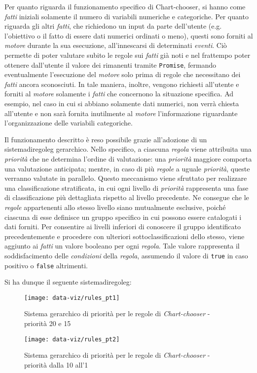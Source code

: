 \bigskip
\noindent Per quanto riguarda il funzionamento specifico di Chart-chooser, si hanno come \emph{fatti} iniziali solamente il numero di variabili numeriche e categoriche. 
Per quanto riguarda gli altri \emph{fatti}, che richiedono un input da parte dell'utente (e.g. l'obiettivo o il fatto di essere dati numerici ordinati o meno), questi sono 
forniti al \emph{motore} durante la sua esecuzione, all'innescarsi di determinati \emph{eventi}. 
Ciò permette di poter valutare subito le regole sui \emph{fatti} già noti e nel frattempo poter ottenere dall'utente il valore dei rimanenti tramite \texttt{Promise}, fermando eventualmente l'esecuzione del \emph{motore} solo
prima di regole che necessitano dei \emph{fatti} ancora sconosciuti.
In tale maniera, inoltre, vengono richiesti all'utente e forniti al \emph{motore} solamente i \emph{fatti} che concernono la situazione specifica. Ad esempio, nel caso in cui si abbiano solamente dati numerici, 
non verrà chiesta all'utente e non sarà fornita inutilmente al \emph{motore} l'informazione riguardante l'organizzazione delle variabili categoriche.

Il funzionamento descritto è reso possibile grazie all'adozione di un \gls{sistemadiregoleg} gerarchico. Nello specifico, a ciascuna \emph{regola} viene attribuita una \emph{priorità} che ne determina l'ordine di valutazione:
una \emph{priorità} maggiore comporta una valutazione anticipata; mentre, in caso di più \emph{regole} a uguale \emph{priorità}, queste verranno valutate in parallelo.
Questo meccanismo viene sfruttato per realizzare una classificazione stratificata, in cui ogni livello di \emph{priorità} rappresenta una fase di classificazione più dettagliata rispetto al livello precedente. 
Ne consegue che le \emph{regole} appartenenti allo stesso livello siano mutualmente esclusive, poiché ciascuna di esse definisce un gruppo specifico in cui possono essere catalogati i dati forniti.
Per consentire ai livelli inferiori di conoscere il gruppo identificato precedentemente e procedere con ulteriori sottoclassificazioni dello stesso, viene aggiunto ai \emph{fatti} un valore booleano per ogni \emph{regola}. 
Tale valore rappresenta il soddisfacimento delle \emph{condizioni} della \emph{regola}, assumendo il valore di \texttt{true} in caso positivo o \texttt{false} altrimenti.

\bigskip
\noindent Si ha dunque il seguente \gls{sistemadiregoleg}:

\begin{figure}[H] 
    \centering 
    \texttt{[image: data-viz/rules\_pt1]} 
    \caption{Sistema gerarchico di priorità per le regole di \emph{Chart-chooser} - priorità 20 e 15}
    \label{fig:rules_pt1}
\end{figure}
\begin{figure}[H] 
    \centering 
    \texttt{[image: data-viz/rules\_pt2]} 
    \caption{Sistema gerarchico di priorità per le regole di \emph{Chart-chooser} - priorità dalla 10 all'1}
    \label{fig:rules_pt2}
\end{figure}

